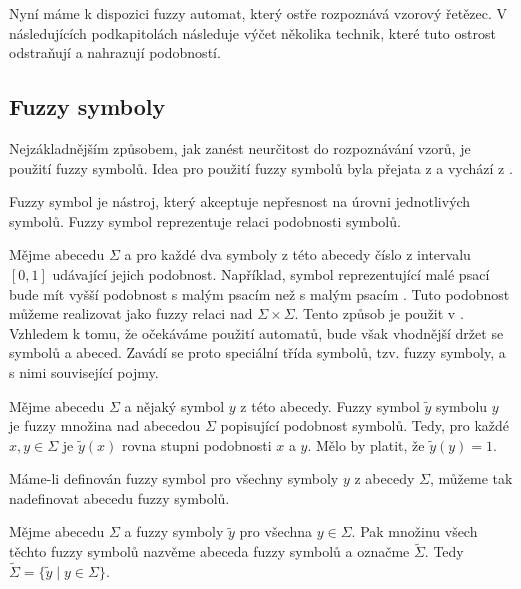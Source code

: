 \documentclass[a4paper,10pt]{article}
\begin{document}
Nyní máme k dispozici fuzzy automat, který ostře rozpoznává vzorový řetězec. V následujících podkapitolách následuje výčet několika technik, které tuto ostrost odstraňují a nahrazují podobností.

\subsection{Fuzzy symboly}
Nejzákladnějším způsobem, jak zanést neurčitost do rozpoznávání vzorů, je použití fuzzy symbolů. Idea pro použití fuzzy symbolů byla přejata z \cite{AstGariGonVillFar-ApprStrMatUsiDefFuzzAutLearExpr} a vychází z \cite{RamGir-ConvFinAutFuzzAutStrComp}.

Fuzzy symbol je nástroj, který akceptuje nepřesnost na úrovni jednotlivých symbolů. Fuzzy symbol reprezentuje relaci podobnosti symbolů.

Mějme abecedu $\Sigma$ a pro každé dva symboly z této abecedy číslo z intervalu $[0, 1]$ udávající jejich podobnost. Například, symbol reprezentující malé psací  bude mít vyšší podobnost s malým psacím  než s malým psacím . Tuto podobnost můžeme realizovat jako fuzzy relaci nad $\Sigma \times \Sigma$. Tento způsob je použit v \cite{RamGir-ConvFinAutFuzzAutStrComp}. Vzhledem k tomu, že očekáváme použití automatů, bude však vhodnější držet se symbolů a abeced. Zavádí se proto speciální třída symbolů, tzv. fuzzy symboly, a s nimi související pojmy.

\begin{definition}
Mějme abecedu $\Sigma$ a nějaký symbol $y$ z této abecedy. Fuzzy symbol $\widetilde{y}$ symbolu $y$ je fuzzy množina nad abecedou $\Sigma$ popisující podobnost symbolů. Tedy, pro každé $x, y \in \Sigma$ je $\widetilde{y}(x)$ rovna stupni podobnosti $x$ a $y$. Mělo by platit, že $\widetilde{y}(y) = 1$.
\end{definition}

Máme-li definován fuzzy symbol pro všechny symboly $y$ z abecedy $\Sigma$, můžeme tak nadefinovat abecedu fuzzy symbolů.

\begin{definition}
Mějme abecedu $\Sigma$ a fuzzy symboly $\widetilde{y}$ pro všechna $y \in \Sigma$. Pak množinu všech těchto fuzzy symbolů nazvěme abeceda fuzzy symbolů a označme $\widetilde{\Sigma}$. Tedy $\widetilde{\Sigma} = \{ \widetilde{y} \mid y \in \Sigma \}$.
\end{definition}
\end{document}
